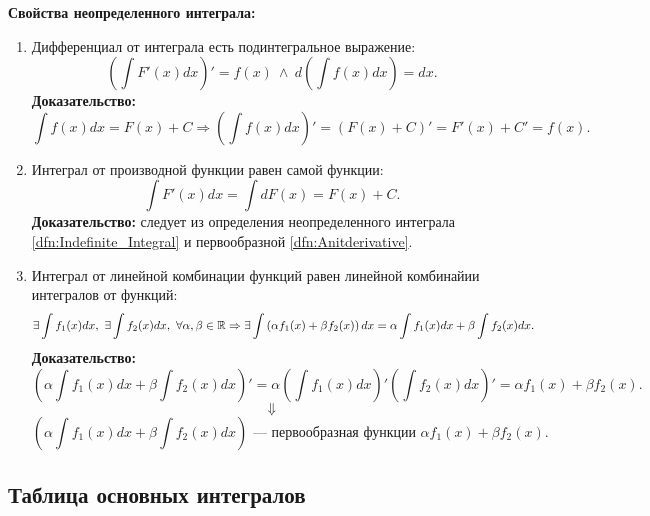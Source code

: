 \pagebreak
\textbf{Свойства неопределенного интеграла:}
\label{prop:Indefinite_Integral}
\begin{enumerate}[label=\bfseries\tiny\protect\circled{\small\arabic*}]
  \item Дифференциал от интеграла есть подинтегральное выражение: 
  \[
      \left( \int F'(x) dx \right)'= f(x) \ \wedge \ d \left( \int f(x)dx \right) = dx
  .\] 
  \textbf{Доказательство:}
  \[
    \int f(x) dx = F(x) + C \Rightarrow \left( \int f(x) dx \right)' = \left( F(x) + C \right)' = F'(x) + C' = f(x)
  .\]
  \item Интеграл от производной функции равен самой функции:
    \[
    \int F'(x) dx = \int dF(x) = F(x) + C
    .\] 
    \textbf{Доказательство:} следует из определения неопределенного интеграла \ref{dfn:Indefinite_Integral} и первообразной \ref{dfn:Anitderivative}.

  \item Интеграл от линейной комбинации функций равен линейной комбинайии интегралов от функций: 
    \[
    \exists \int f_1(x) dx, \ \exists \int f_2(x) dx, \ \forall \alpha, \beta \in \mathbb{R} \Rightarrow \exists \int \left( \alpha f_1(x) + \beta f_2(x)  \right) dx = \alpha \int f_1(x) dx + \beta \int f_2(x) dx 
    .\] 
    \textbf{Доказательство:}
    \[
     \left(  \alpha \int f_1(x) dx + \beta \int f_2(x) dx \right)' = \alpha \left( \int f_1(x)dx \right)' \left( \int f_2(x)dx \right)' = \alpha f_1(x) + \beta f_2(x)
    .\] 
    \[
    \Downarrow
    \] 
    \[
      \left(  \alpha \int f_1(x) dx + \beta \int f_2(x) dx \right) \text{ --- первообразная функции } \alpha f_1(x) + \beta f_2(x)
    .\] 
\end{enumerate}



\subsection{Таблица основных интегралов}%
\label{sub:Table_of_Integrals}

